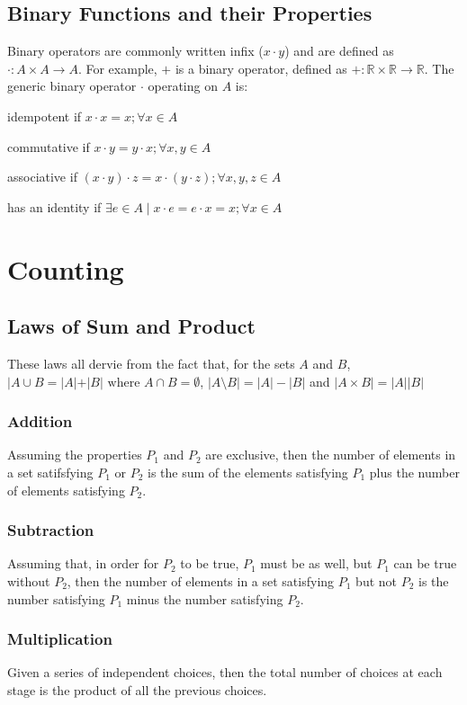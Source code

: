 \documentclass[10pt]{article}
\begin{document}
\subsection{Binary Functions and their Properties}
Binary operators are commonly written infix ($x\cdot y$) and are defined as $\cdot:A\times A\to A$.  For example, $+$ is a binary operator, defined as $+:\mathbb R\times\mathbb R\to\mathbb R$.  The generic binary operator $\cdot$ operating on $A$ is:
\begin{itemize*}
\item idempotent if $x\cdot x = x; \forall x\in A$
\item commutative if $x\cdot y= y\cdot x; \forall x,y\in A$
\item associative if $(x\cdot y)\cdot z = x\cdot(y\cdot z); \forall x,y,z\in A$
\item has an identity if $\exists e\in A \mid x\cdot e = e \cdot x = x; \forall x \in A$
\end{itemize*}
\section{Counting}
\subsection{Laws of Sum and Product}
These laws all dervie from the fact that, for the sets $A$ and $B$, $|A\cup B= |A|+|B|\text{ where } A\cap B=\emptyset$, $|A\setminus B|=|A|-|B|$ and $|A\times B|=|A||B|$
\subsubsection{Addition}
Assuming the properties $P_1$ and $P_2$ are exclusive, then the number of elements in a set satifsfying $P_1$ or $P_2$ is the sum of the elements satisfying $P_1$ plus the number of elements satisfying $P_2$.
\subsubsection{Subtraction}
Assuming that, in order for $P_2$ to be true, $P_1$ must be as well, but $P_1$ can be true without $P_2$, then the number of elements in a set satisfying $P_1$ but not $P_2$ is the number satisfying $P_1$ minus the number satisfying $P_2$.
\subsubsection{Multiplication}
Given a series of independent choices, then the total number of choices at each stage is the product of all the previous choices.
\end{document}
